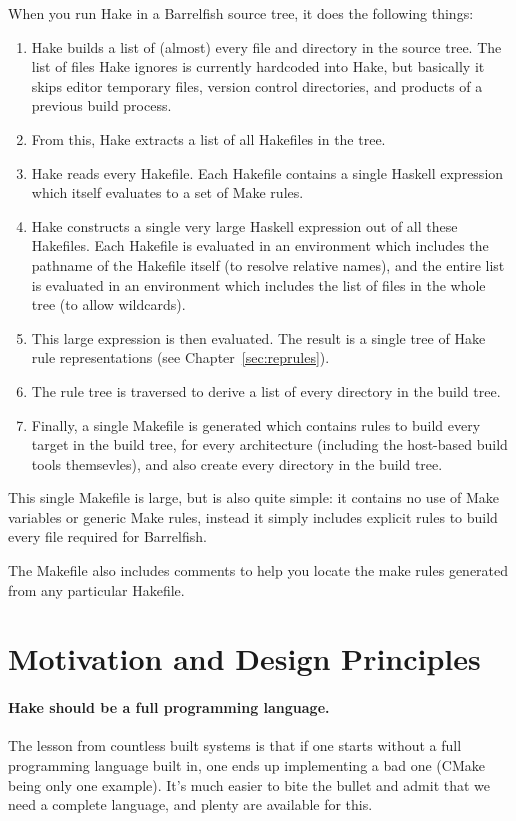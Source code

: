 \documentclass[a4paper,twoside]{report} %
\begin{document}
When you run Hake in a Barrelfish source tree, it does the following things:
\begin{enumerate}
\item Hake builds a list of (almost) every file and directory in the
  source tree.  The list of files Hake ignores is currently hardcoded
  into Hake, but basically it skips editor temporary files, version
  control directories, and products of a previous build process.
\item From this, Hake extracts a list of all Hakefiles in the tree.
\item Hake reads every Hakefile.  Each Hakefile contains a single
  Haskell expression which itself evaluates to a set of Make rules.
\item Hake constructs a single very large Haskell expression out of
  all these Hakefiles.  Each Hakefile is evaluated in an environment
  which includes the pathname of the Hakefile itself (to resolve
  relative names), and the entire list is evaluated in an environment
  which includes the list of files in the whole tree (to allow
  wildcards).
\item This large expression is then evaluated.  The result is a single
  tree of Hake rule representations (see
  Chapter~\ref{sec:reprules}).
\item The rule tree is traversed to derive a list of every directory
  in the build tree.
\item Finally, a single Makefile is generated which contains rules to
  build every target in the build tree, for every architecture
  (including the host-based build tools themsevles), and also create
  every directory in the build tree.
\end{enumerate}

This single Makefile is large, but is also quite simple: it contains
no use of Make variables or generic Make rules, instead it simply
includes explicit rules to build every file required for Barrelfish.

The Makefile also includes comments to help you locate the make rules
generated from any particular Hakefile.

\section{Motivation and Design Principles}

\paragraph{Hake should be a full programming language.}  The lesson
from countless built systems is that if one starts without a full
programming language built in, one ends up implementing a bad one
(CMake being only one example).  It's much easier to bite the bullet
and admit that we need a complete language, and plenty are available
for this.
\end{document}

